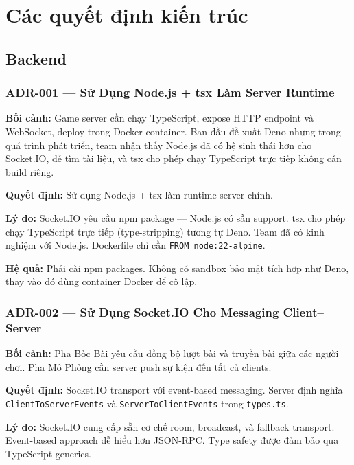 

\section{Các quyết định kiến trúc}

\subsection{Backend}

\subsubsection*{ADR-001 — Sử Dụng Node.js + tsx Làm Server Runtime}

\textbf{Bối cảnh:} Game server cần chạy TypeScript, expose HTTP endpoint và WebSocket, deploy trong Docker container. Ban đầu đề xuất Deno nhưng trong quá trình phát triển, team nhận thấy Node.js đã có hệ sinh thái hơn cho Socket.IO, dễ tìm tài liệu, và tsx cho phép chạy TypeScript trực tiếp không cần build riêng.

\textbf{Quyết định:} Sử dụng Node.js + tsx làm runtime server chính.

\textbf{Lý do:} Socket.IO yêu cầu npm package — Node.js có sẵn support. tsx cho phép chạy TypeScript trực tiếp (type-stripping) tương tự Deno. Team đã có kinh nghiệm với Node.js. Dockerfile chỉ cần \texttt{FROM node:22-alpine}.

\textbf{Hệ quả:} Phải cài npm packages. Không có sandbox bảo mật tích hợp như Deno, thay vào đó dùng container Docker để cô lập.


\subsubsection*{ADR-002 — Sử Dụng Socket.IO Cho Messaging Client–Server}

\textbf{Bối cảnh:} Pha Bốc Bài yêu cầu đồng bộ lượt bài và truyền bài giữa các người chơi. Pha Mô Phỏng cần server push sự kiện đến tất cả clients.

\textbf{Quyết định:} Socket.IO transport với event-based messaging. Server định nghĩa \texttt{ClientToServerEvents} và \texttt{ServerToClientEvents} trong \texttt{types.ts}.

\textbf{Lý do:} Socket.IO cung cấp sẵn cơ chế room, broadcast, và fallback transport. Event-based approach dễ hiểu hơn JSON-RPC. Type safety được đảm bảo qua TypeScript generics.

